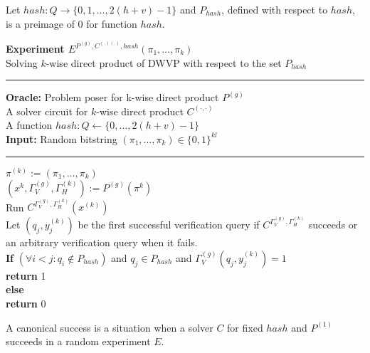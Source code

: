 %
%
Let $hash:Q\rightarrow\{0,1,\dots, 2(h+v)-1\}$ and $P_{hash}$, defined with respect to $hash$, is a preimage of $0$ for function $hash$.

%
%
%
\begin{codeblock}
  \textbf{Experiment $E^{P^{(g)}, C^{(.)(.)}, hash}(\pi_1, \dots, \pi_k)$} \\
  Solving $k$-wise direct product of DWVP with respect to the set $P_{hash}$
  \medskip

  \hrule

  \medskip
  \textbf{Oracle:} Problem poser for k-wise direct product $P^{(g)}$ \\
  \IndI A solver circuit for $k$-wise direct product $C^{(\cdot, \cdot)}$ \\
  \IndI A function $hash: Q \leftarrow \{0, \dots, 2(h+v) - 1\}$\\
  \textbf{Input:} Random bitstring $(\pi_1, \dots, \pi_k) \in \{0,1\}^{kl}$\\

  \medskip\hrule\medskip

  $\pi^{(k)} := \left(\pi_1, \dots, \pi_k \right)$\\
  $(x^{k}, \Gamma_V^{(g)}, \Gamma_H^{(k)}) := P^{(g)}(\pi^{k})$\\
  Run $C^{\Gamma_V^{(g)}, \Gamma_H^{(k)}} (x^{(k)})$ \\
  \IndI Let $(q_j,y_j^{(k)})$ be the first successful verification query if $C^{\Gamma_V^{(g)}, \Gamma_H^{(k)}}$ succeeds or \\
  \IndI an arbitrary verification query when it fails.\\
  \textbf{If} $(\forall i < j :  q_i \notin P_{hash} )$ and $q_j \in P_{hash}$ and $\Gamma_V^{(g)}(q_j, y_j^{(k)}) = 1$ \\
  \IndI \textbf{return} 1\\
  \textbf{else}\\
  \IndI \textbf{return} 0\\
\end{codeblock}
%
A canonical success is a situation when a solver $C$ for fixed $hash$ and $P^{(1)}$ succeeds in a random experiment $E$.
